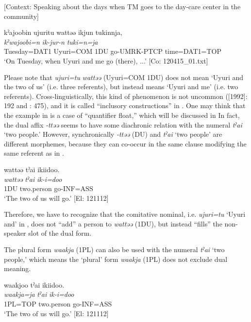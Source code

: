\ea \label{ex:5:4}   [Context: Speaking about the days when TM goes to the day-care center in the community]

\glll  kˀajoobin  ujuritu  wattəə  ikjun  tukinnja,\\
\textit{kˀwajoobi}\footnotemark\textit{=n}  \textit{}  \textit{}  \textit{ik-jur-n}  \textit{tuki=n=ja}\\
Tuesday=DAT1  Uyuri=COM  1DU  go-UMRK-PTCP  time=DAT1=TOP\\
\glt ‘On Tuesday, when Uyuri and me go (there), ...’ [Co: 120415\_01.txt]
\z
{}

Please note that \textit{ujuri=tu} \textit{wattəə} (Uyuri=COM 1DU) does not mean ‘Uyuri and the two of us’ (i.e. three referents), but instead means ‘Uyuri and me’ (i.e. two referents). Cross-linguistically, this kind of phenomenon is not uncommon (\citealt{Jespersen1924}[1992]: 192 and \citealt{Moravcsik2003}: 475), and it is called “inclusory constructions” in \citet{Lichtenberk2000}. One may think that the example in  is a case of “quantifier float,” which will be discussed in  In fact, the dual affix \textit{{}-ttəə} seems to have some diachronic relation with the numeral \textit{tˀai} ‘two people.’ However, synchronically \textit{{}-ttəə} (DU) and \textit{tˀai} ‘two people’ are different morphemes, because they can co-occur in the same clause modifying the same referent as in .

\ea \label{ex:5:5}   %
\glll  wattəə  tˀai  ikiidoo.\\
\textit{wattəə}  \textit{tˀai}  \textit{ik-i=doo}\\
1DU  two.person  go-INF=ASS\\
\glt ‘The two of us will go.’ [El: 121112]
\z

Therefore, we have to recognize that the comitative nominal, i.e. \textit{ujuri=tu} ‘Uyuri and’ in , does not “add” a person to \textit{wattəə} (1DU), but instead “fills” the non-speaker slot of the dual form.

The plural form \textit{waakja} (1PL) can also be used with the numeral \textit{tˀai} ‘two people,’ which means the ‘plural’ form \textit{waakja} (1PL) does not exclude dual meaning.

\ea \label{ex:5:6}   %
\glll  waakjoo  tˀai  ikiidoo.\\
\textit{waakja=ja}  \textit{tˀai}  \textit{ik-i=doo}\\
1PL=TOP  two.person  go-INF=ASS\\
\glt ‘The two of us will go.’ [El: 121112]
\z

